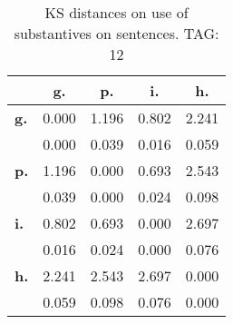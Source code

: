 \begin{table}[h!]
\begin{center}
\begin{tabular}{| l || c | c | c | c |}\hline
 & {\bf g.} & {\bf p.} & {\bf i.} & {\bf h.} \\\hline\hline
{\bf g.} & 0.000 & 1.196 & 0.802 & 2.241 \\
{\bf } & 0.000 & 0.039 & 0.016 & 0.059 \\\hline
{\bf p.} & 1.196 & 0.000 & 0.693 & 2.543 \\
{\bf } & 0.039 & 0.000 & 0.024 & 0.098 \\\hline
{\bf i.} & 0.802 & 0.693 & 0.000 & 2.697 \\
{\bf } & 0.016 & 0.024 & 0.000 & 0.076 \\\hline
{\bf h.} & 2.241 & 2.543 & 2.697 & 0.000 \\
{\bf } & 0.059 & 0.098 & 0.076 & 0.000 \\\hline
\end{tabular}
\caption{KS distances on use of substantives on sentences. TAG: 12}
\end{center}
\end{table}